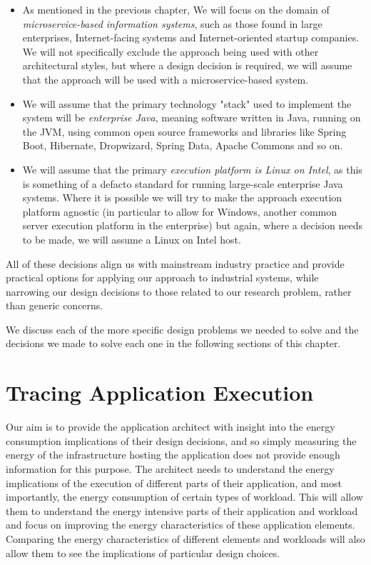 \begin{itemize}
	\item As mentioned in the previous chapter, We will focus on the domain of \emph{microservice-based information systems}, such as those found in large enterprises, Internet-facing systems and Internet-oriented startup companies.  We will not specifically exclude the approach being used with other architectural styles, but where a design decision is required, we will assume that the approach will be used with a microservice-based system.
	\item We will assume that the primary technology "stack" used to implement the system will be \emph{enterprise Java}, meaning software written in Java, running on the JVM, using common open source frameworks and libraries like Spring Boot, Hibernate, Dropwizard, Spring Data, Apache Commons and so on.
	\item We will assume that the primary \emph{execution platform is Linux on Intel}, as this is something of a defacto standard for running large-scale enterprise Java systems.  Where it is possible we will try to make the approach execution platform agnostic (in particular to allow for Windows, another common server execution platform in the enterprise) but again, where a decision needs to be made, we will assume a Linux on Intel host.
\end{itemize}

All of these decisions align us with mainstream industry practice and provide practical options for applying our approach to industrial systems, while narrowing our design decisions to those related to our research problem, rather than generic concerns.

We discuss each of the more specific design problems we needed to solve and the decisions we made to solve each one in the following sections of this chapter.

\section{Tracing Application Execution}

Our aim is to provide the application architect with insight into the energy consumption implications of their design decisions, and so simply measuring the energy of the infrastructure hosting the application does not provide enough information for this purpose.  The architect needs to understand the energy implications of the execution of different parts of their application, and most importantly, the energy consumption of certain types of workload.  This will allow them to understand the energy intensive parts of their application and workload and focus on improving the energy characteristics of these application elements.  Comparing the energy characteristics of different elements and workloads will also allow them to see the implications of particular design choices.

